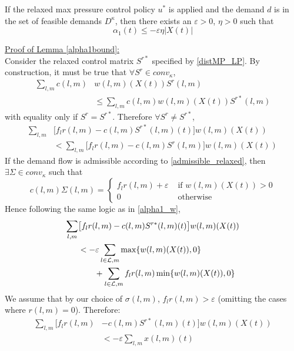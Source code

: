  \begin{Lem} \label{alpha1bound}
If the relaxed max pressure control policy $u^*$ is applied and the demand $d$ is in the set of feasible demands $D^\kappa$, then there exists an $\varepsilon>0$, $\eta>0$ such that 
\begin{equation} 
\alpha_1(t)  \leq -\varepsilon \eta \big| X(t)\big| 
\end{equation}
\end{Lem}









\underline{Proof of Lemma \ref{alpha1bound}:} \\

Consider the relaxed control matrix $S^{r*}$ specified by \eqref{distMP_LP}. By construction, it must be true that $ \forall S^r \in conv_{\kappa}$, 
\begin{align} \nonumber
\sum_{l,m}c(l,m)& w(l,m)(X(t))S^r (l,m) \\
&\leq \sum_{l,m}c(l,m)w(l,m)(X(t))S^{r*}(l,m) 
\end{align}
with equality only if $S^r = S^{r*}$. 
Therefore $\forall S^r \neq S^{r*}$,
\begin{align} \nonumber
 \sum_{l,m}&\big[f_{l}r(l,m) - c(l,m)S^{r*}(l,m)(t)\big]w(l,m)(X(t)) \\
&<   \sum_{l,m}\big[f_{l}r(l,m) - c(l,m)S^r(l,m)\big]w(l,m)(X(t))
\end{align}
If the demand flow is admissible according to \eqref{admissible_relaxed}, then 
$\exists \Sigma \in conv_{\kappa}$ such that 
\begin{equation} \nonumber
c(l,m)\Sigma(l,m) = \begin{cases}
        f_{l}r(l,m) + \varepsilon & \text{ if } w(l,m)(X(t)) > 0 \\
        0 & \text{ otherwise}
    \end{cases}
\end{equation}
Hence following the same logic as in \eqref{alpha1_w}, 
\begin{align} \nonumber
 \sum_{l,m}&\big[f_{l}r(l,m) -  c(l,m)S^{r*}(l,m)(t)\big] w(l,m)(X(t))  \\ \nonumber
&  < -\varepsilon \sum_{l \in \mathcal{L},m} \max\{w(l,m)(X(t)) ,0\} \\
&\qquad +  \sum_{l \in \mathcal{L},m}  f_l r(l,m)  \min\{ w(l,m)(X(t)) ,0\}
\end{align}
We assume that by our choice of $\sigma(l,m)$, $f_{l}r(l,m) > \varepsilon$ (omitting the cases where $r(l,m) = 0$). Therefore:
\begin{align}\nonumber
\sum_{l,m}\big[ f_{l}r(l,m) & - c(l,m)S^{r*}(l,m)(t)\big]w(l,m)(X(t)) \\
&< -\varepsilon \displaystyle\sum_{l,m} x(l,m)(t)
\end{align}







